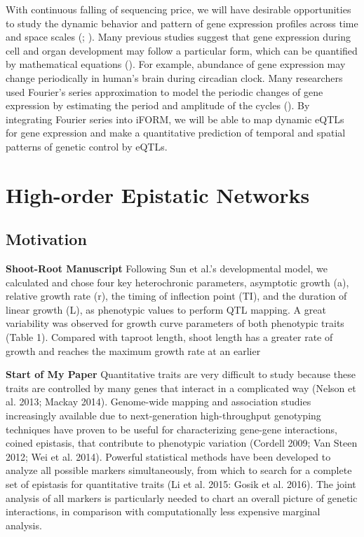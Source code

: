\documentclass[]{book}
\theoremstyle{definition}
\theoremstyle{definition}
\theoremstyle{remark}
\begin{document}
With continuous falling of sequencing price, we will have desirable
opportunities to study the dynamic behavior and pattern of gene
expression profiles across time and space scales
(\cite{vinuela2010genome}; \cite{ackermann2013impact}). Many previous
studies suggest that gene expression during cell and organ development
may follow a particular form, which can be quantified by mathematical
equations (\cite{kim2010wavelet}). For example, abundance of gene
expression may change periodically in human's brain during circadian
clock. Many researchers used Fourier's series approximation to model the
periodic changes of gene expression by estimating the period and
amplitude of the cycles (\cite{li2013using}). By integrating Fourier
series into iFORM, we will be able to map dynamic eQTLs for gene
expression and make a quantitative prediction of temporal and spatial
patterns of genetic control by eQTLs.

\chapter{High-order Epistatic
Networks}\label{high-order-epistatic-networks}

\section{Motivation}\label{motivation-1}

\textbf{Shoot-Root Manuscript} Following Sun et al.'s
\cite{sun2014model} developmental model, we calculated and chose four
key heterochronic parameters, asymptotic growth (a), relative growth
rate (r), the timing of inflection point (TI), and the duration of
linear growth (L), as phenotypic values to perform QTL mapping. A great
variability was observed for growth curve parameters of both phenotypic
traits (Table 1). Compared with taproot length, shoot length has a
greater rate of growth and reaches the maximum growth rate at an earlier

\textbf{Start of My Paper} Quantitative traits are very difficult to
study because these traits are controlled by many genes that interact in
a complicated way (Nelson et al. 2013; Mackay 2014). Genome-wide mapping
and association studies increasingly available due to next-generation
high-throughput genotyping techniques have proven to be useful for
characterizing gene-gene interactions, coined epistasis, that contribute
to phenotypic variation (Cordell 2009; Van Steen 2012; Wei et al. 2014).
Powerful statistical methods have been developed to analyze all possible
markers simultaneously, from which to search for a complete set of
epistasis for quantitative traits (Li et al. 2015: Gosik et al. 2016).
The joint analysis of all markers is particularly needed to chart an
overall picture of genetic interactions, in comparison with
computationally less expensive marginal analysis.
\end{document}
